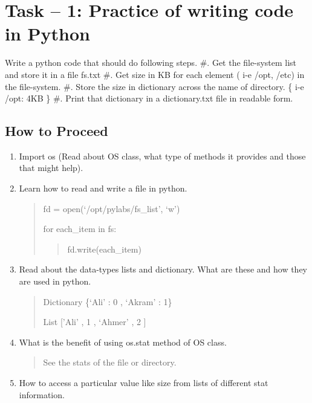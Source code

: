 \documentclass[letterpaper,10pt,english]{sphinxmanual}
\begin{document}
\section{Task – 1: Practice of writing code in Python}
\label{week-08:task-1-practice-of-writing-code-in-python}
Write a python code that should do following steps.
\#. Get the file-system list and store it in a file fs.txt
\#. Get size in KB for each element ( i-e /opt, /etc) in the file-system.
\#. Store the size in dictionary across the name of directory. \{ i-e /opt: 4KB \}
\#. Print that dictionary in a dictionary.txt file in readable form.


\subsection{How to Proceed}
\label{week-08:how-to-proceed}\begin{enumerate}
\item {} 
Import os (Read about OS class, what type of methods it provides and those that might help).

\item {} 
Learn how to read and write a file in python.
\begin{quote}

fd = open(`/opt/pylabs/fs\_list', `w')

for each\_item in fs:
\begin{quote}

fd.write(each\_item)
\end{quote}
\end{quote}

\item {} 
Read about the data-types lists and dictionary. What are these and how they are used in python.
\begin{quote}

Dictionary \{`Ali' : 0 , `Akram' : 1\}

List {[}'Ali' , 1 , `Ahmer' , 2 {]}
\end{quote}

\item {} 
What is the benefit of using os.stat method of OS class.
\begin{quote}

See the stats of the file or directory.
\end{quote}

\item {} 
How to access a particular value like size from lists of different stat information.
\begin{quote}


\end{quote}
\end{enumerate}
\end{document}
